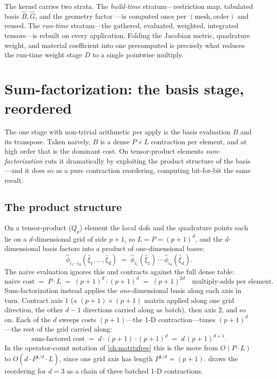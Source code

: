 \begin{keyidea}
The kernel carries two strata. The \emph{build-time} stratum---restriction map,
tabulated basis $\hat B,\hat G$, and the geometry factor ---is
computed once per $(\text{mesh},\text{order})$ and reused. The \emph{run-time}
stratum---the gathered, evaluated, weighted, integrated tensors---is rebuilt on
every application. Folding the Jacobian metric, quadrature weight, and material
coefficient into one precomputed  is precisely what reduces the
run-time weight stage $D$ to a single pointwise multiply.
\end{keyidea}

\section{Sum-factorization: the basis stage, reordered}
\label{sec:appk-sumfac}

The one stage with non-trivial arithmetic per apply is the basis evaluation $B$ and
its transpose. Taken naively, $B$ is a dense $P\times L$ contraction per element,
and at high order that is the dominant cost. On tensor-product elements
\emph{sum-factorization} cuts it dramatically by exploiting the product structure
of the basis---and it does so as a pure contraction reordering, computing
bit-for-bit the same result.

\subsection{The product structure}

On a tensor-product ($Q_p$) element the local dofs and the quadrature points each
lie on a $d$-dimensional grid of side $p+1$, so $L=P=(p+1)^d$, and the
$d$-dimensional basis factors into a product of one-dimensional bases:
\[
  \hat\phi_{i_1\cdots i_d}(\hat\xi_1,\dots,\hat\xi_d)
  \;=\; \hat\phi_{i_1}(\hat\xi_1)\,\cdots\,\hat\phi_{i_d}(\hat\xi_d).
\]
The naive evaluation ignores this and contracts against the full dense table:
\begin{equation}
  \text{naive cost} \;=\; P\cdot L \;=\; (p+1)^d\cdot(p+1)^d \;=\; (p+1)^{2d}
  \quad\text{multiply-adds per element.}
  \label{eq:appk-naive}
\end{equation}
Sum-factorization instead applies the \emph{one}-dimensional basis along each axis
in turn. Contract axis $1$ (a $(p+1)\times(p+1)$ matrix applied along one grid
direction, the other $d-1$ directions carried along as batch), then axis $2$, and
so on. Each of the $d$ sweeps costs $(p+1)$---the 1-D contraction---times
$(p+1)^d$---the rest of the grid carried along:
\begin{equation}
  \text{sum-factored cost} \;=\; d\cdot(p+1)\cdot(p+1)^d \;=\; d\,(p+1)^{d+1}.
  \label{eq:appk-factored}
\end{equation}
In the operator-count notation of \cref{ch:matrixfree} this is the move from
$O(P\cdot L)$ to $O(d\cdot P^{1/d}\cdot L)$, since one grid axis has length
$P^{1/d}=(p+1)$.  draws the reordering for $d=3$ as a chain
of three batched 1-D contractions.

